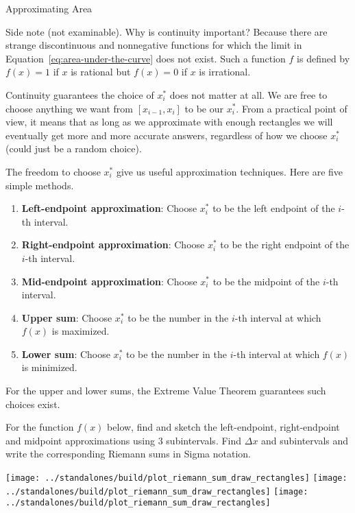 \documentclass[../main.tex]{subfiles}
\begin{document}
\begin{lesson}{Approximating Area}
\begin{mdframed}[style=withref-compact]
  \end{mdframed}

  Side note (not examinable). Why is continuity important? Because there are strange discontinuous and nonnegative functions for which the limit in Equation~\eqref{eq:area-under-the-curve} does not exist.  Such a function \(f\) is defined by \(f(x) = 1\) if \(x\) is rational but \(f(x) = 0\) if \(x\) is irrational. 
 
  \clearpage
  Continuity guarantees the choice of \(x_{i}^{*}\) does not matter at all. We are free to choose anything we want from \([x_{i-1}, x_{i}]\) to be our \(x_{i}^{*}\). From a practical point of view, it means that as long as we approximate with enough rectangles we will eventually get more and more accurate answers, regardless of how we choose \(x_{i}^{*}\) (could just be a random choice).

  The freedom to choose \(x_{i}^{*}\) give us useful approximation techniques. Here are five simple methods.
  \begin{enumerate}
    \item \textbf{Left-endpoint approximation}: Choose \(x_{i}^{*}\) to be the left endpoint of the \(i\)-th interval.
    \item \textbf{Right-endpoint approximation}: Choose \(x_{i}^{*}\) to be the right endpoint of the \(i\)-th interval.
    \item \textbf{Mid-endpoint approximation}: Choose \(x_{i}^{*}\) to be the midpoint of the \(i\)-th interval.
    \item \textbf{Upper sum}: Choose \(x_{i}^{*}\) to be the number in the \(i\)-th interval at which \(f(x)\) is maximized.
    \item \textbf{Lower sum}: Choose \(x_{i}^{*}\) to be the number in the \(i\)-th interval at which \(f(x)\) is minimized.
  \end{enumerate}
  For the upper and lower sums, the Extreme Value Theorem guarantees such choices exist.

  \medskip
  \begin{example}
    For the function \(f(x)\) below, find and sketch the left-endpoint, right-endpoint and midpoint approximations using \(3\) subintervals. Find \(\Delta x\) and subintervals and write the corresponding Riemann sums in Sigma notation.

    \hfill{}
    \texttt{[image: ../standalones/build/plot\_riemann\_sum\_draw\_rectangles]}
    \hfill{}
    \texttt{[image: ../standalones/build/plot\_riemann\_sum\_draw\_rectangles]}
    \hfill{}
    \texttt{[image: ../standalones/build/plot\_riemann\_sum\_draw\_rectangles]}
    \hfill{}


\end{example}
\end{lesson}
\end{document}
